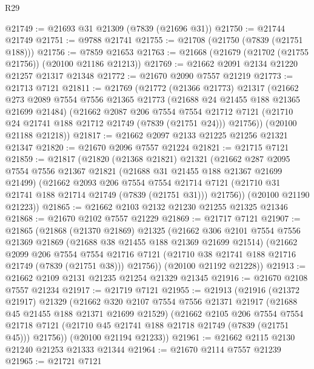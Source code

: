 \begin{lexlean}{R29}
\begin{coremodule}
@21749 := @21693 @31 @21309 (@7839 (@21696 @31))
@21750 := @21744 @21749
@21751 := @9788 @21741
@21755 := @21708 (@21750 (@7839 (@21751 @188)))
@21756 := @7859 @21653
@21763 := @21668 (@21679 (@21702 (@21755 @21756)) (@20100 @21186 @21213))
@21769 := @21662 @2091 @2134 @21220 @21257 @21317 @21348
@21772 := @21670 @2090 @7557 @21219
@21773 := @21713 @7121
@21811 := @21769
    (@21772
      (@21366 @21773)
      @21317
      (@21662
        @273
        @2089
        @7554
        @7556
        @21365
        @21773
        (@21688 @24 @21455 @188 @21365 @21699 @21484)
        (@21662
          @2087
          @206
          @7554
          @7554
          @21712
          @7121
          (@21710 @24 @21741 @188 @21712 @21749 (@7839 (@21751 @24)))
          @21756))
      (@20100 @21188 @21218))
@21817 := @21662 @2097 @2133 @21225 @21256 @21321 @21347
@21820 := @21670 @2096 @7557 @21224
@21821 := @21715 @7121
@21859 := @21817
    (@21820
      (@21368 @21821)
      @21321
      (@21662
        @287
        @2095
        @7554
        @7556
        @21367
        @21821
        (@21688 @31 @21455 @188 @21367 @21699 @21499)
        (@21662
          @2093
          @206
          @7554
          @7554
          @21714
          @7121
          (@21710 @31 @21741 @188 @21714 @21749 (@7839 (@21751 @31)))
          @21756))
      (@20100 @21190 @21223))
@21865 := @21662 @2103 @2132 @21230 @21255 @21325 @21346
@21868 := @21670 @2102 @7557 @21229
@21869 := @21717 @7121
@21907 := @21865
    (@21868
      (@21370 @21869)
      @21325
      (@21662
        @306
        @2101
        @7554
        @7556
        @21369
        @21869
        (@21688 @38 @21455 @188 @21369 @21699 @21514)
        (@21662
          @2099
          @206
          @7554
          @7554
          @21716
          @7121
          (@21710 @38 @21741 @188 @21716 @21749 (@7839 (@21751 @38)))
          @21756))
      (@20100 @21192 @21228))
@21913 := @21662 @2109 @2131 @21235 @21254 @21329 @21345
@21916 := @21670 @2108 @7557 @21234
@21917 := @21719 @7121
@21955 := @21913
    (@21916
      (@21372 @21917)
      @21329
      (@21662
        @320
        @2107
        @7554
        @7556
        @21371
        @21917
        (@21688 @45 @21455 @188 @21371 @21699 @21529)
        (@21662
          @2105
          @206
          @7554
          @7554
          @21718
          @7121
          (@21710 @45 @21741 @188 @21718 @21749 (@7839 (@21751 @45)))
          @21756))
      (@20100 @21194 @21233))
@21961 := @21662 @2115 @2130 @21240 @21253 @21333 @21344
@21964 := @21670 @2114 @7557 @21239
@21965 := @21721 @7121

\end{coremodule}
\end{lexlean}
